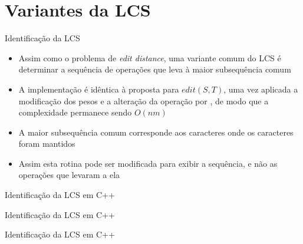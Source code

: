 \section{Variantes da LCS}

\begin{frame}[fragile]{Identificação da LCS}

    \begin{itemize}
        \item Assim como o problema de \textit{edit distance}, uma variante comum do LCS é
            determinar a sequência de operações que leva à maior subsequência comum

        \item A implementação é idêntica à proposta para $edit(S, T)$, uma vez aplicada a 
            modificação dos pesos e a alteração da operação  por 
            , de modo que a complexidade permanece sendo $O(nm)$

        \item A maior subsequência comum corresponde aos caracteres onde os caracteres foram
            mantidos

        \item Assim esta rotina pode ser modificada para exibir a sequência, e não as operações
            que levaram a ela
    \end{itemize}

\end{frame}

\begin{frame}[fragile]{Identificação da LCS em C++}
\end{frame}

\begin{frame}[fragile]{Identificação da LCS em C++}
\end{frame}

\begin{frame}[fragile]{Identificação da LCS em C++}
\end{frame}
